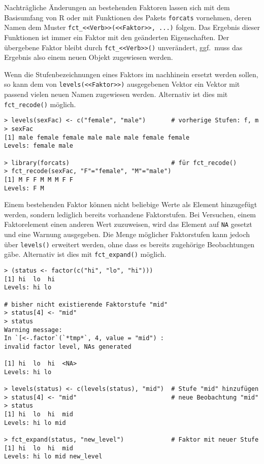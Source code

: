 Nachträgliche Änderungen an bestehenden Faktoren lassen sich mit dem Basisumfang von R oder mit Funktionen des Pakets \lstinline!forcats! \cite{Wickham2019} vornehmen, deren Namen dem Muster \lstinline!fct_<<Verb>>(<<Faktor>>, ...)! folgen. Das Ergebnis dieser Funktionen ist immer ein Faktor mit den geänderten Eigenschaften. Der übergebene Faktor bleibt durch \lstinline!fct_<<Verb>>()! unverändert, ggf.\ muss das Ergebnis also einem neuen Objekt zugewiesen werden.

Wenn die Stufenbezeichnungen eines Faktors im nachhinein ersetzt werden sollen, so kann dem von \lstinline!levels(<<Faktor>>)! ausgegebenen Vektor ein Vektor mit passend vielen neuen Namen zugewiesen werden. Alternativ ist dies mit \lstinline!fct_recode()! möglich.
\begin{lstlisting}
> levels(sexFac) <- c("female", "male")       # vorherige Stufen: f, m
> sexFac
[1] male female female male male male female female
Levels: female male

> library(forcats)                            # für fct_recode()
> fct_recode(sexFac, "F"="female", "M"="male")
[1] M F F M M M F F
Levels: F M
\end{lstlisting}

Einem bestehenden Faktor können nicht beliebige Werte als Element hinzugefügt werden, sondern lediglich bereits vorhandene Faktorstufen. Bei Versuchen, einem Faktorelement einen anderen Wert zuzuweisen, wird das Element auf \lstinline!NA! gesetzt und eine Warnung ausgegeben. Die Menge möglicher Faktorstufen kann jedoch über \lstinline!levels()! erweitert werden, ohne dass es bereits zugehörige Beobachtungen gäbe. Alternativ ist dies mit \lstinline!fct_expand()! möglich.
\begin{lstlisting}
> (status <- factor(c("hi", "lo", "hi")))
[1] hi  lo  hi
Levels: hi lo

# bisher nicht existierende Faktorstufe "mid"
> status[4] <- "mid"
> status
Warning message:
In `[<-.factor`(`*tmp*`, 4, value = "mid") :
invalid factor level, NAs generated

[1] hi  lo  hi  <NA>
Levels: hi lo

> levels(status) <- c(levels(status), "mid")  # Stufe "mid" hinzufügen
> status[4] <- "mid"                          # neue Beobachtung "mid"
> status
[1] hi  lo  hi  mid
Levels: hi lo mid

> fct_expand(status, "new_level")             # Faktor mit neuer Stufe
[1] hi  lo  hi  mid
Levels: hi lo mid new_level
\end{lstlisting}


